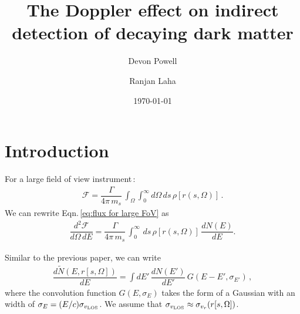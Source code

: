 \documentclass[aps,prl,10pt,twocolumn,superscriptaddress,showpacs]{revtex4-1}
\begin{document}
\title{The Doppler effect on indirect detection of decaying dark matter}
\author{Devon Powell}
\author{Ranjan Laha}
\date{\today}

\begin{abstract}

\end{abstract}


\maketitle


\section{Introduction}
\label{sec:Introduction}

For a large field of view instrument\,\cite{Figueroa-Feliciano:2015gwa}:
\begin{eqnarray}
\mathcal{F} = \dfrac{\Gamma}{4\pi \, m_s} \, \int_{\Omega} \int _0 ^\infty d\Omega \, ds \, \rho[r(s, \Omega)] \, .
\label{eq:flux for large FoV}
\end{eqnarray}
We can rewrite Eqn.\,\ref{eq:flux for large FoV} as 
\begin{eqnarray}
\dfrac{d^2 \mathcal{F}}{d\Omega \, dE} =  \dfrac{\Gamma}{4\pi \, m_s} \, \int _0 ^\infty  \, ds \, \rho[r(s, \Omega)] \, \dfrac{dN(E)}{dE} .
\label{eq:double differential for the flux}
\end{eqnarray}

Similar to the previous paper, we can write
\begin{eqnarray}
\dfrac{d \tilde{N} (E, r[s, \Omega])}{dE} =\int dE' \, \dfrac{dN(E')}{dE'} \, G(E - E', \sigma_{E'}) \, ,
\label{eq:formula for modified dNdE}
\end{eqnarray}
where the convolution function $G(E, \sigma_E)$ takes the form of a Gaussian with an width of $\sigma_E = (E/c) \sigma_{v_{\rm LOS}}$.  We assume that $\sigma_{v_{\rm LOS}} \approx \sigma_{v_r}(r[s,\Omega])$.
\end{document}

